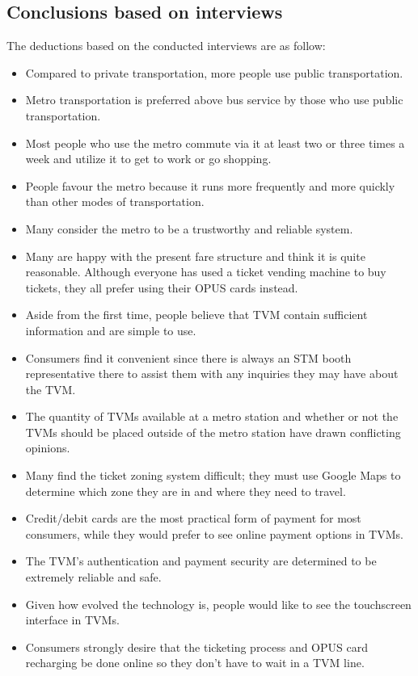 \documentclass[a4paper,12pt]{article}
\begin{document}
\subsection{Conclusions based on interviews}
The deductions based on the conducted interviews are as follow:
\begin{itemize}
    \item Compared to private transportation, more people use public transportation.
    \item Metro transportation is preferred above bus service by those who use public transportation.
    \item Most people who use the metro commute via it at least two or three times a week and utilize it to get to work or go shopping.
    \item People favour the metro because it runs more frequently and more quickly than other modes of transportation.
    \item Many consider the metro to be a trustworthy and reliable system.
    \item Many are happy with the present fare structure and think it is quite reasonable.
    Although everyone has used a ticket vending machine to buy tickets, they all prefer using their OPUS cards instead.
    \item Aside from the first time, people believe that TVM contain sufficient information and are simple to use.
    \item Consumers find it convenient since there is always an STM booth representative there to assist them with any inquiries they may have about the TVM.
    \item The quantity of TVMs available at a metro station and whether or not the TVMs should be placed outside of the metro station have drawn conflicting opinions.
    \item Many find the ticket zoning system difficult; they must use Google Maps to determine which zone they are in and where they need to travel.
    \item Credit/debit cards are the most practical form of payment for most consumers, while they would prefer to see online payment options in TVMs.
    \item The TVM's authentication and payment security are determined to be extremely reliable and safe.
    \item Given how evolved the technology is, people would like to see the touchscreen interface in TVMs.
    \item Consumers strongly desire that the ticketing process and OPUS card recharging be done online so they don't have to wait in a TVM line.

\end{itemize}
\end{document}
